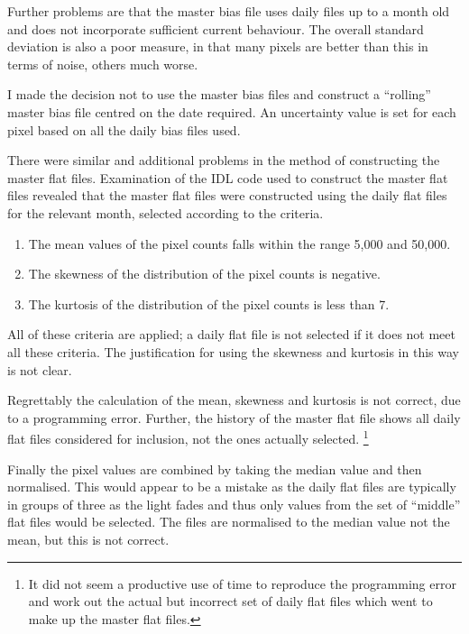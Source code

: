 Further problems are that the master bias file uses daily files up to a month
old and does not incorporate sufficient current behaviour. The overall standard
deviation is also a poor measure, in that many pixels are better than this in
terms of noise, others much worse.

I made the decision not to use the master bias files and construct a ``rolling''
master bias file centred on the date required. An uncertainty value is set for
each pixel based on all the daily bias files used.

There were similar and additional problems in the method of constructing the
master flat files. Examination of the IDL code used to construct the master flat
files revealed  that the master flat files were constructed using the daily flat files for the
relevant month, selected according to the criteria.

\begin{enumerate}
  \item The mean values of the pixel counts falls within the range 5,000 and
  50,000.
  \item The skewness of the distribution of the pixel counts is negative.
  \item The kurtosis of the distribution of the pixel counts is less than 7.
\end{enumerate}

All of these criteria are applied; a daily flat file is not selected if it does
not meet all these criteria. The justification for using the skewness and
kurtosis in this way is not clear.

Regrettably the calculation of the mean, skewness and kurtosis is not correct,
due to a programming error. Further, the history of the master flat file shows
all daily flat files considered for inclusion, not the ones actually selected.
\footnote{It did not seem a productive use of time to reproduce the programming error
and work out the actual but incorrect set of daily flat files which went to make
up the master flat files.}

Finally the pixel values are combined by taking the median value and then
normalised. This would appear to be a mistake as the daily flat files are
typically in groups of three as the light fades and thus only values from the
set of ``middle'' flat files would be selected. The files are normalised to the
median value not the mean, but this is not correct.

